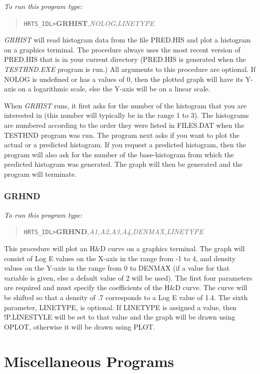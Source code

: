 {\em To run this program type:}
\begin{quote}
     {\tt HRTS\_IDL>}{\bf GRHIST},{\it NOLOG,LINETYPE}
\end{quote}

{\em GRHIST} will read histogram data from the file PRED.HIS and plot a
   histogram on a graphics terminal.  The procedure always uses the most
   recent version of PRED.HIS that is in your current directory (PRED.HIS
   is generated when the {\em TESTHND.EXE} program is run.)  All arguments to
   this procedure are optional.  If NOLOG is undefined or has a values of
   0, then the plotted graph will have its Y-axis on a logarithmic scale,
   else the Y-axis will be on a linear scale.

       When {\em GRHIST} runs, it first asks for the number of the histogram
   that you are interested in (this number will typically be in the range
   1 to 3).  The histograms are numbered according to the order they
   were listed in FILES.DAT when the TESTHND program was run.  The
   program next asks if you want to plot the actual or a predicted
   histogram.  If you request a predicted histogram, then the program will
   also ask for the number of the base-histogram from which the predicted
   histogram was generated.  The graph will then be generated and the
   program will terminate.

\subsubsection{GRHND}

{\em To run this program type:}
\begin{quote}
      {\tt HRTS\_IDL>}{\bf GRHND},{\it A1,A2,A3,A4,DENMAX,LINETYPE}
\end{quote}
       This procedure will plot an H\&D curve on a graphics terminal.  The
   graph will consist of Log E values on the X-axis in the range from -1
   to 4, and density values on the Y-axis in the range from 0 to DENMAX
   (if a value for that variable is given, else a default value of 2 will
   be used).  The first four parameters are required and must specify the
   coefficients of the H\&D curve.  The curve will be shifted so that a
   density of .7 corresponds to a Log E value of 1.4.  The sixth
   parameter, LINETYPE, is optional.  If LINETYPE is assigned a value,
   then !P.LINESTYLE will be set to that value and the graph will be drawn
   using OPLOT, otherwise it will be drawn using PLOT.
\newpage

\section{Miscellaneous Programs}

